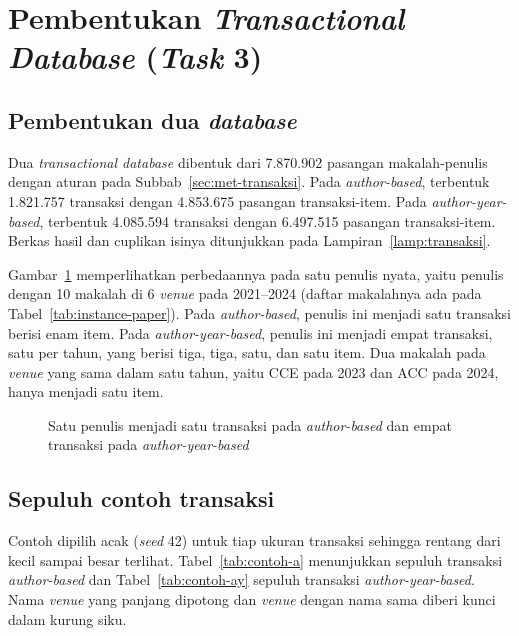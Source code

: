 \section{Pembentukan \textit{Transactional Database} (\textit{Task} 3)}
\label{sec:hasil-t3}

\subsection{Pembentukan dua \textit{database}}
\label{sec:hasil-bentuk}
Dua \textit{transactional database} dibentuk dari 7.870.902 pasangan makalah-penulis dengan aturan pada Subbab~\ref{sec:met-transaksi}. Pada \textit{author-based}, terbentuk 1.821.757 transaksi dengan 4.853.675 pasangan transaksi-item. Pada \textit{author-year-based}, terbentuk 4.085.594 transaksi dengan 6.497.515 pasangan transaksi-item. Berkas hasil dan cuplikan isinya ditunjukkan pada Lampiran~\ref{lamp:transaksi}.

Gambar~\ref{fig:ilustrasi} memperlihatkan perbedaannya pada satu penulis nyata, yaitu penulis dengan 10 makalah di 6 \textit{venue} pada 2021--2024 (daftar makalahnya ada pada Tabel~\ref{tab:instance-paper}). Pada \textit{author-based}, penulis ini menjadi satu transaksi berisi enam item. Pada \textit{author-year-based}, penulis ini menjadi empat transaksi, satu per tahun, yang berisi tiga, tiga, satu, dan satu item. Dua makalah pada \textit{venue} yang sama dalam satu tahun, yaitu CCE pada 2023 dan ACC pada 2024, hanya menjadi satu item.

\begin{figure}[ht]
\centering
{}
\caption{Satu penulis menjadi satu transaksi pada \textit{author-based} dan empat transaksi pada \textit{author-year-based}}
\label{fig:ilustrasi}
\end{figure}

\subsection{Sepuluh contoh transaksi}
\label{sec:hasil-contoh}
Contoh dipilih acak (\textit{seed} 42) untuk tiap ukuran transaksi sehingga rentang dari kecil sampai besar terlihat. Tabel~\ref{tab:contoh-a} menunjukkan sepuluh transaksi \textit{author-based} dan Tabel~\ref{tab:contoh-ay} sepuluh transaksi \textit{author-year-based}. Nama \textit{venue} yang panjang dipotong dan \textit{venue} dengan nama sama diberi kunci dalam kurung siku.

